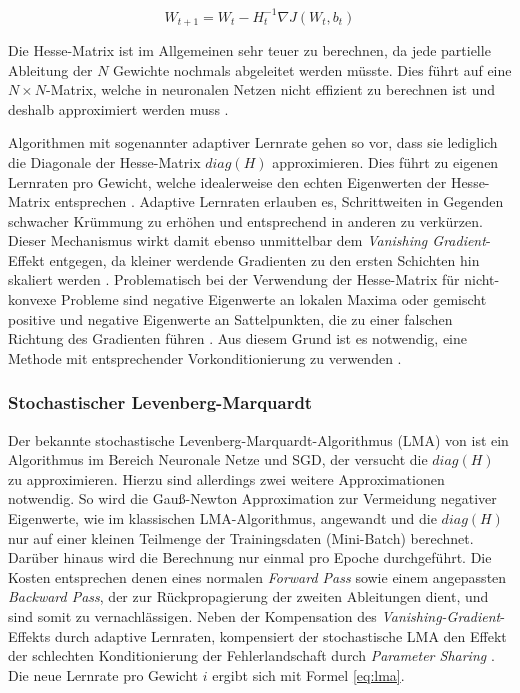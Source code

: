 \begin{equation}
\label{eq:hessianstep} 
W_{t+1} = W_t - H_t^{-1} \nabla J(W_t,b_t)
\end{equation}

Die Hesse-Matrix ist im Allgemeinen sehr teuer zu berechnen, da jede partielle Ableitung der $N$ Gewichte nochmals abgeleitet werden müsste. Dies führt auf eine $N \times N $-Matrix, welche in neuronalen Netzen nicht effizient zu berechnen ist und deshalb approximiert werden muss \cite[vgl.][]{LeCun1998b}. 

Algorithmen mit sogenannter adaptiver Lernrate gehen so vor, dass sie lediglich die Diagonale der Hesse-Matrix $diag(H)$ approximieren. Dies führt zu eigenen Lernraten pro Gewicht, welche idealerweise den echten Eigenwerten der Hesse-Matrix entsprechen \cite[vgl.][]{LeCun1998b}. Adaptive Lernraten erlauben es, Schrittweiten in Gegenden schwacher Krümmung zu erhöhen und entsprechend in anderen zu verkürzen. Dieser Mechanismus wirkt damit ebenso unmittelbar dem \textit{Vanishing Gradient}-Effekt entgegen, da kleiner werdende Gradienten zu den ersten Schichten hin skaliert werden \cite[vgl.][]{Martens2010}. 
Problematisch bei der Verwendung der Hesse-Matrix für nicht-konvexe Probleme sind negative Eigenwerte an lokalen Maxima oder gemischt positive und negative Eigenwerte an Sattelpunkten, die zu einer falschen Richtung des Gradienten führen \cite[vgl.][]{Dauphin14}. Aus diesem Grund ist es notwendig, eine Methode mit entsprechender Vorkonditionierung zu verwenden \cite[vgl.][]{Dauphin2015}.


\subsubsection{Stochastischer Levenberg-Marquardt}
Der bekannte stochastische Levenberg-Marquardt-Algorithmus (LMA) von \cite{LeCun1998b} ist ein Algorithmus im Bereich Neuronale Netze und SGD, der versucht die $diag(H)$ zu approximieren. Hierzu sind allerdings zwei weitere Approximationen notwendig. So wird die Gauß-Newton Approximation zur Vermeidung negativer Eigenwerte, wie im klassischen LMA-Algorithmus, angewandt und die $diag(H)$ nur auf einer kleinen Teilmenge der Trainingsdaten (Mini-Batch) berechnet. Darüber hinaus wird die Berechnung nur einmal pro Epoche durchgeführt. Die Kosten entsprechen denen eines normalen \textit{Forward Pass} sowie einem angepassten \textit{Backward Pass}, der zur Rückpropagierung der zweiten Ableitungen dient, und sind somit zu vernachlässigen. 
Neben der Kompensation des \textit{Vanishing-Gradient}-Effekts durch adaptive Lernraten, kompensiert der stochastische LMA den Effekt der schlechten Konditionierung der Fehlerlandschaft durch \textit{Parameter Sharing} \cite[vgl.][]{LeCun1998b}.
Die neue Lernrate pro Gewicht $i$ ergibt sich mit Formel \ref{eq:lma}.

